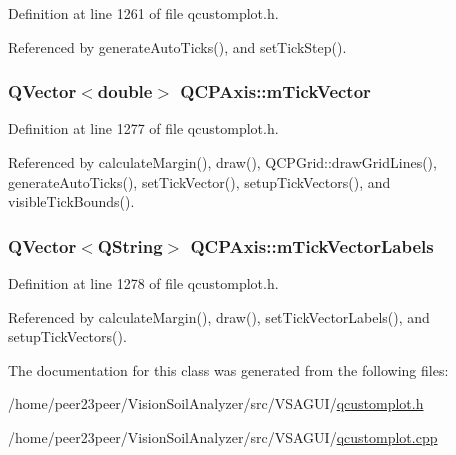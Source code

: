 Definition at line 1261 of file qcustomplot.\+h.



Referenced by generate\+Auto\+Ticks(), and set\+Tick\+Step().

\hypertarget{class_q_c_p_axis_aae0f9b9973b85be601200f00f5825087}{}
\subsubsection[{m\+Tick\+Vector}]{\setlength{\rightskip}{0pt plus 5cm}Q\+Vector$<$double$>$ Q\+C\+P\+Axis\+::m\+Tick\+Vector\hspace{0.3cm}{\ttfamily [protected]}}\label{class_q_c_p_axis_aae0f9b9973b85be601200f00f5825087}


Definition at line 1277 of file qcustomplot.\+h.



Referenced by calculate\+Margin(), draw(), Q\+C\+P\+Grid\+::draw\+Grid\+Lines(), generate\+Auto\+Ticks(), set\+Tick\+Vector(), setup\+Tick\+Vectors(), and visible\+Tick\+Bounds().

\hypertarget{class_q_c_p_axis_aeee4bd0fca3f587eafe33843d1cb4f82}{}
\subsubsection[{m\+Tick\+Vector\+Labels}]{\setlength{\rightskip}{0pt plus 5cm}Q\+Vector$<$Q\+String$>$ Q\+C\+P\+Axis\+::m\+Tick\+Vector\+Labels\hspace{0.3cm}{\ttfamily [protected]}}\label{class_q_c_p_axis_aeee4bd0fca3f587eafe33843d1cb4f82}


Definition at line 1278 of file qcustomplot.\+h.



Referenced by calculate\+Margin(), draw(), set\+Tick\+Vector\+Labels(), and setup\+Tick\+Vectors().



The documentation for this class was generated from the following files\+:\begin{DoxyCompactItemize}
\item 
/home/peer23peer/\+Vision\+Soil\+Analyzer/src/\+V\+S\+A\+G\+U\+I/\hyperlink{qcustomplot_8h}{qcustomplot.\+h}\item 
/home/peer23peer/\+Vision\+Soil\+Analyzer/src/\+V\+S\+A\+G\+U\+I/\hyperlink{qcustomplot_8cpp}{qcustomplot.\+cpp}\end{DoxyCompactItemize}
